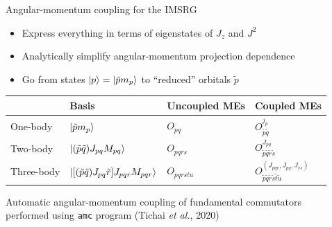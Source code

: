 \documentclass[aspectratio=169]{beamer}
\begin{document}
\begin{frame}{Angular-momentum coupling for the IMSRG}
  \begin{itemize}
    \item Express everything in terms of eigenstates of $J_{z}$ and $J^2$
    \item Analytically simplify angular-momentum projection dependence
    \item Go from states $\ket{p}=\ket{\tilde{p}m_p}$ to ``reduced'' orbitals $\tilde{p}$
  \end{itemize}
  \pause
  \begin{center}
    \begin{tabular*}{0.9\textwidth}{l| l | l| l}
      & Basis & Uncoupled MEs & Coupled MEs \\
      \hline
      One-body & $\ket{\tilde{p} m_p}$ & $O_{pq}$ & $O^{j_{p}}_{\tilde{p}\tilde{q}}$ \\
      Two-body & $\ket{(\tilde{p} \tilde{q}) J_{pq} M_{pq}}$ & $O_{pqrs}$ & $O^{J_{pq}}_{\tilde{p}\tilde{q}\tilde{r}\tilde{s}}$ \\
      Three-body & $\ket{[(\tilde{p} \tilde{q}) J_{pq} \tilde{r}] J_{pqr} M_{pqr}}$ & $O_{pqrstu}$ & $O^{(J_{pqr}, J_{pq}, J_{rs})}_{\tilde{p}\tilde{q}\tilde{r}\tilde{s}\tilde{t}\tilde{u}}$
    \end{tabular*}
  \end{center}

  Automatic angular-momentum coupling of fundamental commutators \\
  performed using \texttt{amc} program {\tiny (Tichai \textit{et al.}, 2020)}

\end{frame}
\end{document}
